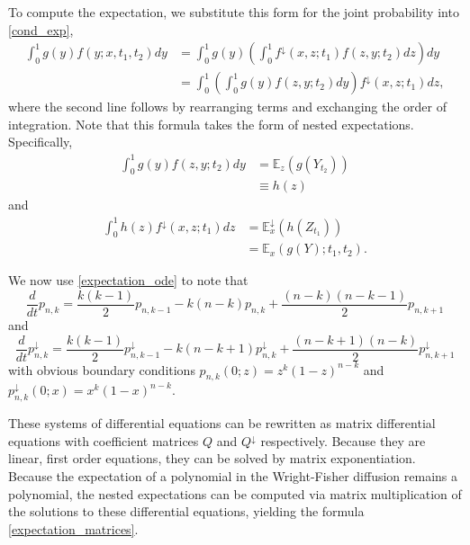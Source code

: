 \documentclass[11pt, oneside]{article}   	%
\begin{document}
To compute the expectation, we substitute this form for the joint probability into \eqref{cond_exp}, 
\begin{align*}
 \int_0^1 g(y) f(y; x, t_1, t_2)dy &= \int_0^1g(y)  \left( \int_0^1 f^{\downarrow}(x, z; t_1)f(z, y; t_2)dz \right) dy  \\
 &= \int_0^1 \left( \int_0^1 g(y) f(z, y; t_2)dy \right) f^{\downarrow}(x, z; t_1) dz,
\end{align*}
where the second line follows by rearranging terms and exchanging the order of integration. Note that this formula takes the form of nested expectations. Specifically,
\begin{align*}
\int_0^1 g(y) f(z, y; t_2) dy &= \mathbb{E}_z(g(Y_{t_2})) \\
&\equiv h(z)
\end{align*}
and
\begin{align*}
\int_0^1 h(z) f^\downarrow(x, z; t_1)dz &= \mathbb{E}_x^\downarrow(h(Z_{t_1})) \\
&= \mathbb{E}_x(g(Y); t_1, t_2).
\end{align*}

We now use \eqref{expectation_ode} to note that
\[
\frac{d}{dt}p_{n,k} = \frac{k(k-1)}{2}p_{n,k-1} - k(n-k)p_{n,k} + \frac{(n-k)(n-k-1)}{2}p_{n,k+1}
\]
and
\[
\frac{d}{dt}p^\downarrow_{n,k} = \frac{k(k-1)}{2}p^\downarrow_{n,k-1} - k(n-k+1)p^\downarrow_{n,k} + \frac{(n-k+1)(n-k)}{2}p^\downarrow_{n,k+1}
\]
with obvious boundary conditions $p_{n,k}(0; z) = z^k(1-z)^{n-k}$ and $p_{n,k}^\downarrow(0; x) = x^k(1-x)^{n-k}$.

These systems of differential equations can be rewritten as matrix differential equations with coefficient matrices $Q$ and $Q^\downarrow$ respectively. Because they are linear, first order equations, they can be solved by matrix exponentiation. Because the expectation of a polynomial in the Wright-Fisher diffusion remains a polynomial, the nested expectations can be computed via matrix multiplication of the solutions to these differential equations, yielding the formula \eqref{expectation_matrices}.
\end{document}
